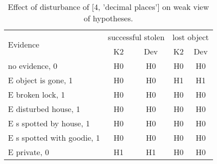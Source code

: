 \begin{table}\begin{tabular}{l|cc|cc}\toprule\multirow{2}{*}{Evidence} & \multicolumn{2}{c}{successful stolen}& \multicolumn{2}{c}{lost object}\\& {K2} & {Dev}& {K2} & {Dev}\\\midrule
no evidence, 0 & H0&H0&H0&H0\\E object is gone, 1 & H0&H0&H1&H1\\E broken lock, 1 & H0&H0&H0&H0\\E disturbed house, 1 & H0&H0&H0&H0\\E s spotted by house, 1 & H0&H0&H0&H0\\E s spotted with goodie, 1 & H0&H0&H0&H0\\E private, 0 & H1&H1&H0&H0\\\bottomrule\end{tabular}\caption{Effect of disturbance of [4, 'decimal places'] on weak view of hypotheses.}\end{table}